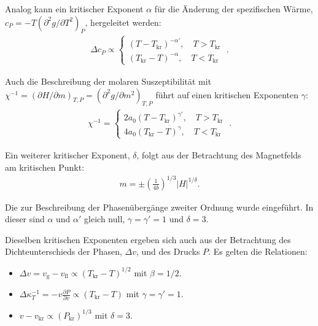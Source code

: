 \begin{summary}
Analog kann ein kritischer Exponent $\alpha$ für die Änderung der spezifischen Wärme, ${c_P=-T(\partial^2g/\partial T^2)_P}$, hergeleitet werden:
\begin{align*}
        \Delta c_P \propto \left\{ 
            \begin{aligned}
                \left(T-T_\mathrm{kr}\right)^{-\alpha'}, \quad T>T_\mathrm{kr}\\
                \left(T_\mathrm{kr}-T\right)^{-\alpha}, \quad T<T_\mathrm{kr}
            \end{aligned}
        \right.\;.
\end{align*}

Auch die Beschreibung der molaren Suszeptibilität mit ${\chi^{-1}=\left(\partial H/\partial m\right)_{T,P}}=(\partial^2g/\partial m^2)_{T,P}$ führt auf einen kritischen Exponenten $\gamma$:
\begin{align*}
    \chi^{-1}=\left\{ 
        \begin{aligned}
            2a_0\left(T-T_\mathrm{kr}\right)^{\gamma'}, \quad T>T_\mathrm{kr}\\
            4a_0\left(T_\mathrm{kr}-T\right)^{\gamma}, \quad T<T_\mathrm{kr}
        \end{aligned}
    \right.\;.
\end{align*}

Ein weiterer kritischer Exponent, $\delta$, folgt aus der Betrachtung des Magnetfelds am kritischen Punkt:
\begin{align*}
    m=\pm \left(\frac{1}{4b}\right)^{1/3}|H|^{1/\delta}.
\end{align*}

Die  zur Beschreibung der Phasenübergänge zweiter Ordnung wurde eingeführt.  
In dieser sind $\alpha$ und $\alpha'$ gleich null, $\gamma=\gamma'=1$ und $\delta=3$.

Dieselben kritischen Exponenten ergeben sich auch aus der Betrachtung des Dichteunterschieds der Phasen, $\Delta v$, und des Drucks $P$. Es gelten die Relationen:
\begin{itemize}
    \item $\Delta v=v_\mathrm{g}-v_\mathrm{fl}\propto \left(T_\mathrm{kr}-T\right)^{1/2}$ mit $\beta=1/2$.
    \item $\Delta \kappa_T^{-1}=-v\frac{\partial P}{\partial v}\propto \left(T_\mathrm{kr}-T\right)$ mit $\gamma=\gamma'=1$.
    \item $v-v_\mathrm{kr}\propto \left(P_\mathrm{kr}\right)^{1/3}$ mit $\delta=3$.
\end{itemize} 
\end{summary}